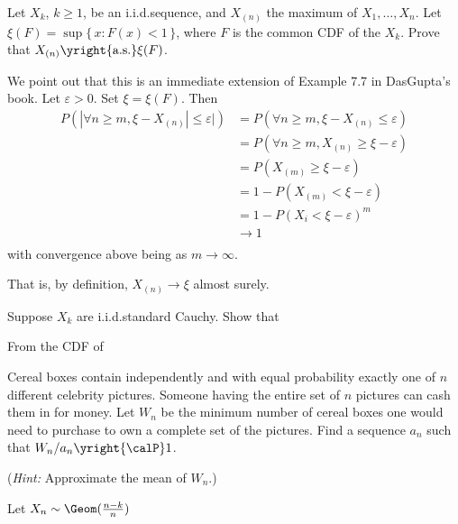 \begin{problem}
  Let \(X_k\), \(k\geq 1\), be an i.i.d.\@ sequence, and \(X_{(n)}\) the
  maximum of \(X_1,\dotsc,X_n\). Let \(\xi(F)=\sup\{\,x:F(x)<1\,\}\), where
  \(F\) is the common CDF of the \(X_k\). Prove that
  \(X_{(n)}\yright{\text{a.s.}}\xi(F)\).
\end{problem}
\begin{solution}
  We point out that this is an immediate extension of Example 7.7 in
  DasGupta's book. Let $\varepsilon >0$. Set $\xi = \xi(F)$. Then
  \begin{align*}
    P(|\forall n \geq m, \xi - X_{(n)}| \leq \varepsilon|)
    &= P(\forall n \geq m, \xi - X_{(n)} \leq \varepsilon)\\
    &= P(\forall n \geq m, X_{(n)} \geq \xi - \varepsilon )\\
    &= P(X_{(m)} \geq \xi - \varepsilon )\\
    &= 1- P(X_{(m)} < \xi - \varepsilon )\\
    &= 1- P(X_i < \xi - \varepsilon)^m\\
    &\to 1\\
  \end{align*}
  with convergence above being as $m \to \infty$.

  That is, by definition, $X_{(n)} \to \xi$ almost surely.
\end{solution}
\newpage

\begin{problem}[DasGupta 7.14 (a)]
  Suppose \(X_k\) are i.i.d.\@ standard Cauchy. Show that
\end{problem}
\begin{solution}
  From the CDF of
\end{solution}
\newpage

\begin{problem}
  Cereal boxes contain independently and with equal probability exactly one
  of \(n\) different celebrity pictures. Someone having the entire set of
  \(n\) pictures can cash them in for money. Let \(W_n\) be the minimum
  number of cereal boxes one would need to purchase to own a complete set
  of the pictures. Find a sequence \(a_n\) such that
  \(W_n/a_n\yright{\calP} 1\).

  \noindent (\emph{Hint:} Approximate the mean of \(W_n\).)
\end{problem}
\begin{solution}
  Let \(X_n\sim\Geom(\frac{n-k}{n})\)
\end{solution}
\newpage

